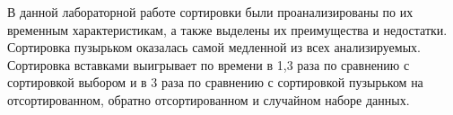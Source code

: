 \Conclusion %

В данной лабораторной работе сортировки были проанализированы по их временным характеристикам, а также выделены их преимущества и недостатки. Сортировка пузырьком оказалась самой медленной из всех анализируемых. Сортировка вставками выигрывает по времени в 1,3 раза по сравнению с сортировкой выбором и в 3 раза по сравнению с сортировкой пузырьком на отсортированном, обратно отсортированном и случайном наборе данных. 

